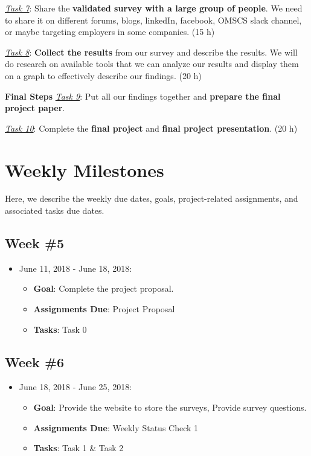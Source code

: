 \documentclass{sigchi}
\begin{document}
\textit{\underline{Task 7}}: Share the \textbf{validated survey with a large group of people}. We need to share it on different forums, blogs, linkedIn, facebook, OMSCS slack channel, or maybe targeting employers in some companies. (15 h)

\textit{\underline{Task 8}}: \textbf{Collect the results} from our survey and describe the results. We will do research on available tools that we can analyze our results and display them on a graph to effectively describe our findings. (20 h)\newline

\textbf{Final Steps}\newline
\textit{\underline{Task 9}}: Put all our findings together and \textbf{prepare the final project paper}.

\textit{\underline{Task 10}}: Complete the \textbf{final project} and \textbf{final project presentation}.  (20 h)\newline


\section{Weekly Milestones}
Here, we describe the weekly due dates, goals, project-related assignments, and associated tasks due dates.

\subsection{Week \#5}
\begin{itemize}
 	\item June 11, 2018 - June 18, 2018:
	\begin{itemize}
 		\item \textbf{Goal}: Complete the project proposal.
 		\item \textbf{Assignments Due}: Project Proposal
 		\item \textbf{Tasks}: Task 0
 	\end{itemize} 
 \end{itemize}


\subsection{Week \#6}
\begin{itemize}
 	\item June 18, 2018 - June 25, 2018:
	\begin{itemize}
 		\item \textbf{Goal}: Provide the website to store the surveys, Provide survey questions.
 		\item \textbf{Assignments Due}: Weekly Status Check 1
 		\item \textbf{Tasks}: Task 1 \& Task 2
	\end{itemize}
 \end{itemize} 
 
\end{document}
